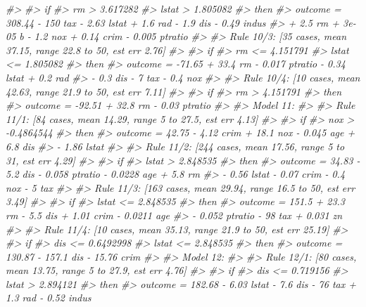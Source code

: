 \documentclass[]{book}
\newenvironment{Shaded}{\begin{snugshade}}{\end{snugshade}}
\newcommand{\CommentTok}[1]{\textcolor[rgb]{0.56,0.35,0.01}{\textit{#1}}}
\begin{document}
\begin{Shaded}
\begin{Highlighting}[]
\CommentTok{#> }
\CommentTok{#>     if}
\CommentTok{#>  rm > 3.617282}
\CommentTok{#>  lstat > 1.805082}
\CommentTok{#>     then}
\CommentTok{#>  outcome = 308.44 - 150 tax - 2.63 lstat + 1.6 rad - 1.9 dis - 0.49 indus}
\CommentTok{#>            + 2.5 rm + 3e-05 b - 1.2 nox + 0.14 crim - 0.005 ptratio}
\CommentTok{#> }
\CommentTok{#>   Rule 10/3: [35 cases, mean 37.15, range 22.8 to 50, est err 2.76]}
\CommentTok{#> }
\CommentTok{#>     if}
\CommentTok{#>  rm <= 4.151791}
\CommentTok{#>  lstat <= 1.805082}
\CommentTok{#>     then}
\CommentTok{#>  outcome = -71.65 + 33.4 rm - 0.017 ptratio - 0.34 lstat + 0.2 rad}
\CommentTok{#>            - 0.3 dis - 7 tax - 0.4 nox}
\CommentTok{#> }
\CommentTok{#>   Rule 10/4: [10 cases, mean 42.63, range 21.9 to 50, est err 7.11]}
\CommentTok{#> }
\CommentTok{#>     if}
\CommentTok{#>  rm > 4.151791}
\CommentTok{#>     then}
\CommentTok{#>  outcome = -92.51 + 32.8 rm - 0.03 ptratio}
\CommentTok{#> }
\CommentTok{#> Model 11:}
\CommentTok{#> }
\CommentTok{#>   Rule 11/1: [84 cases, mean 14.29, range 5 to 27.5, est err 4.13]}
\CommentTok{#> }
\CommentTok{#>     if}
\CommentTok{#>  nox > -0.4864544}
\CommentTok{#>     then}
\CommentTok{#>  outcome = 42.75 - 4.12 crim + 18.1 nox - 0.045 age + 6.8 dis}
\CommentTok{#>            - 1.86 lstat}
\CommentTok{#> }
\CommentTok{#>   Rule 11/2: [244 cases, mean 17.56, range 5 to 31, est err 4.29]}
\CommentTok{#> }
\CommentTok{#>     if}
\CommentTok{#>  lstat > 2.848535}
\CommentTok{#>     then}
\CommentTok{#>  outcome = 34.83 - 5.2 dis - 0.058 ptratio - 0.0228 age + 5.8 rm}
\CommentTok{#>            - 0.56 lstat - 0.07 crim - 0.4 nox - 5 tax}
\CommentTok{#> }
\CommentTok{#>   Rule 11/3: [163 cases, mean 29.94, range 16.5 to 50, est err 3.49]}
\CommentTok{#> }
\CommentTok{#>     if}
\CommentTok{#>  lstat <= 2.848535}
\CommentTok{#>     then}
\CommentTok{#>  outcome = 151.5 + 23.3 rm - 5.5 dis + 1.01 crim - 0.0211 age}
\CommentTok{#>            - 0.052 ptratio - 98 tax + 0.031 zn}
\CommentTok{#> }
\CommentTok{#>   Rule 11/4: [10 cases, mean 35.13, range 21.9 to 50, est err 25.19]}
\CommentTok{#> }
\CommentTok{#>     if}
\CommentTok{#>  dis <= 0.6492998}
\CommentTok{#>  lstat <= 2.848535}
\CommentTok{#>     then}
\CommentTok{#>  outcome = 130.87 - 157.1 dis - 15.76 crim}
\CommentTok{#> }
\CommentTok{#> Model 12:}
\CommentTok{#> }
\CommentTok{#>   Rule 12/1: [80 cases, mean 13.75, range 5 to 27.9, est err 4.76]}
\CommentTok{#> }
\CommentTok{#>     if}
\CommentTok{#>  dis <= 0.719156}
\CommentTok{#>  lstat > 2.894121}
\CommentTok{#>     then}
\CommentTok{#>  outcome = 182.68 - 6.03 lstat - 7.6 dis - 76 tax + 1.3 rad - 0.52 indus}

\end{Highlighting}
\end{Shaded}
\end{document}

